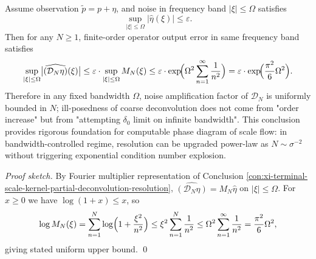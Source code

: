 \begin{conclusion}\label{con:xi-terminal-scale-kernel-bandwidth-conditioned}
Assume observation \(\widetilde p=p+\eta\), and noise in frequency band \(|\xi|\le\Omega\) satisfies
\[
\sup_{|\xi|\le\Omega}|\widehat\eta(\xi)|\le\varepsilon.
\]
Then for any \(N\ge 1\), finite-order operator output error in same frequency band satisfies
\[
\sup_{|\xi|\le\Omega}\bigl|\widehat{(\mathcal D_N\eta)}(\xi)\bigr|
\le
\varepsilon\cdot \sup_{|\xi|\le\Omega}M_N(\xi)
\le
\varepsilon\cdot \exp\!\Bigl(\Omega^2\sum_{n=1}^{\infty}\frac{1}{n^2}\Bigr)
=\varepsilon\cdot \exp\!\Bigl(\frac{\pi^2}{6}\Omega^2\Bigr).
\]
Therefore in any fixed bandwidth \(\Omega\), noise amplification factor of \(\mathcal D_N\) is uniformly bounded in \(N\);
ill-posedness of coarse deconvolution does not come from "order increase" but from "attempting \(\delta_0\) limit on infinite bandwidth".
This conclusion provides rigorous foundation for computable phase diagram of scale flow: in bandwidth-controlled regime, resolution can be upgraded power-law as \(N\sim\sigma^{-2}\) without triggering exponential condition number explosion.
\end{conclusion}
\begin{proof}[Proof sketch]
By Fourier multiplier representation of Conclusion \ref{con:xi-terminal-scale-kernel-partial-deconvolution-resolution},
\(
\widehat{(\mathcal D_N\eta)}=M_N\widehat\eta
\)
on \(|\xi|\le\Omega\).
For \(x\ge 0\) we have \(\log(1+x)\le x\), so
\[
\log M_N(\xi)=\sum_{n=1}^{N}\log\Bigl(1+\frac{\xi^2}{n^2}\Bigr)\le \xi^2\sum_{n=1}^{N}\frac{1}{n^2}
\le \Omega^2\sum_{n=1}^{\infty}\frac{1}{n^2}=\frac{\pi^2}{6}\Omega^2,
\]
giving stated uniform upper bound. \qed
\end{proof}

